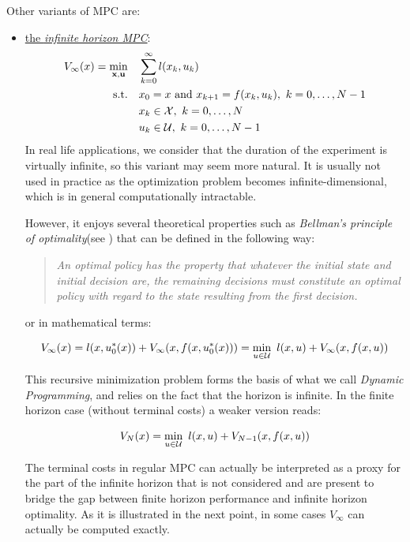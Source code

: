 \documentclass[12pt]{article}
\begin{document}
\noindent Other variants of MPC are:
\begin{itemize}[label=\textbullet]
	\item \underline{the \textit{infinite horizon MPC}}:
	\begin{align*}
		V_\infty(x)=\underset{\bf{x},\bf{u}}{\min} &\quad \sum_{k=0}^{\infty}l(x_k,u_k)\\
		\text{s.t.} &\quad x_0=x\text{ and }x_{k+1}=f(x_k,u_k),~k=0,\ldots,N-1\\
		&\quad x_k\in\cal{X},~k=0,\ldots,N\\
		&\quad u_k\in\cal{U},~k=0,\ldots,N-1
	\end{align*}
	In real life applications, we consider that the duration of the experiment is virtually infinite, so this variant may seem more natural.
	It is usually not used in practice as the optimization problem becomes infinite-dimensional, which is in general computationally intractable.

	However, it enjoys several theoretical properties such as \textit{Bellman's principle of optimality}(see \cite{Bellman:DynamicProgramming}) that can be defined in the following way:
	\begin{quotation}
		\textit{An optimal policy has the property that whatever the initial state and initial decision are, the remaining decisions must constitute an optimal policy with regard to the state resulting from the first decision.}
	\end{quotation}
	or in mathematical terms:

	\begin{equation}
		\label{eq:inf-bellman}
		V_\infty(x)=l(x,u_0^*(x))+V_\infty(x,f(x,u_0^*(x)))=\min_{u\in\cal{U}}~l(x,u)+V_\infty(x,f(x,u))
	\end{equation}

	\noindent This recursive minimization problem forms the basis of what we call \textit{Dynamic Programming}, and relies on the fact that the horizon is infinite.
	In the finite horizon case (without terminal costs) a weaker version reads:

	$$V_N(x)=\min_{u\in\cal{U}}~l(x,u)+V_{N-1}(x,f(x,u))$$

	The terminal costs in regular MPC can actually be interpreted as a proxy for the part of the infinite horizon that is not considered and are present to bridge the gap between finite horizon performance and infinite horizon optimality.
	As it is illustrated in the next point, in some cases $V_\infty$ can actually be computed exactly.



\end{itemize}
\end{document}
